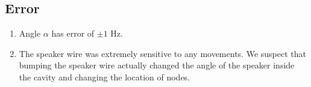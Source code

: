 \documentclass[12pt]{article}
\begin{document}
		\subsection{Error}
			
			\begin{enumerate}
				\item Angle $\alpha$ has error of $\pm 1$ Hz.
				
				\item The speaker wire was extremely sensitive to any movements. We suspect that bumping the speaker wire actually changed the angle of the speaker inside the cavity and changing the location of nodes.
			\end{enumerate}
\end{document}
